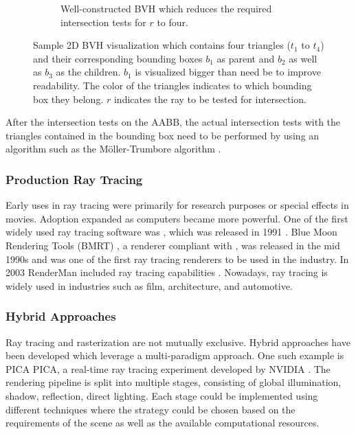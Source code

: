 \begin{figure}[H]
\begin{subfigure}[b]{0.45\textwidth}
    \caption{Well-constructed \gls{BVH} which reduces the required intersection tests for $r$ to four.}
    \label{fig:bvhGood}
  \end{subfigure}
  \caption{Sample 2D \gls{BVH} visualization which contains four triangles ($t_1$ to $t_4$) and their corresponding bounding boxes $b_1$ as parent and $b_2$ as well as $b_3$ as the children. $b_1$ is visualized bigger than need be to improve readability. The color of the triangles indicates to which bounding box they belong. $r$ indicates the ray to be tested for intersection.}
  \label{fig:bvhVisualized}
\end{figure}

After the intersection tests on the \gls{AABB}, the actual intersection tests with the triangles contained in the bounding box need to be performed by using an algorithm such as the Möller-Trumbore algorithm \cite{mollerTrumboreFastRayTriangleIntersection}.

\subsubsection{Production Ray Tracing}

Early uses in ray tracing were primarily for research purposes or special effects in movies. Adoption expanded as computers became more powerful. One of the first widely used ray tracing software was , which was released in 1991 \cite{POV_Ray_Documentation}. Blue Moon Rendering Tools (\gls{BMRT}) \cite{bmrt}, a renderer compliant with , was released in the mid 1990s and was one of the first ray tracing renderers to be used in the industry. In 2003 \gls{RenderMan} included ray tracing capabilities \cite{RenderMan_11_Release_Notes}. Nowadays, ray tracing is widely used in industries such as film, architecture, and automotive.

\subsubsection{Hybrid Approaches}

Ray tracing and rasterization are not mutually exclusive. Hybrid approaches have been developed which leverage a multi-paradigm approach. One such example is PICA PICA, a real-time ray tracing experiment developed by NVIDIA \cite{hybridRenderingBarreBrisebois2019}. The rendering pipeline is split into multiple stages, consisting of global illumination, shadow, reflection, direct lighting. Each stage could be implemented using different techniques where the strategy could be chosen based on the requirements of the scene as well as the available computational resources.

